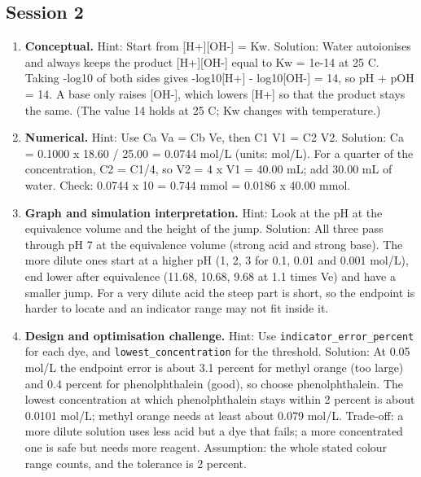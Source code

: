 \documentclass[11pt,a4paper]{article}
\begin{document}
\subsection*{Session 2}
\begin{enumerate}[nosep]
\item \textbf{Conceptual.} Hint: Start from [H+][OH-] = Kw. Solution: Water autoionises and always keeps the product [H+][OH-] equal to Kw = 1e-14 at 25 C. Taking -log10 of both sides gives -log10[H+] - log10[OH-] = 14, so pH + pOH = 14. A base only raises [OH-], which lowers [H+] so that the product stays the same. (The value 14 holds at 25 C; Kw changes with temperature.)
\item \textbf{Numerical.} Hint: Use Ca Va = Cb Ve, then C1 V1 = C2 V2. Solution: Ca = 0.1000 x 18.60 / 25.00 = 0.0744 mol/L (units: mol/L). For a quarter of the concentration, C2 = C1/4, so V2 = 4 x V1 = 40.00 mL; add 30.00 mL of water. Check: 0.0744 x 10 = 0.744 mmol = 0.0186 x 40.00 mmol.
\item \textbf{Graph and simulation interpretation.} Hint: Look at the pH at the equivalence volume and the height of the jump. Solution: All three pass through pH 7 at the equivalence volume (strong acid and strong base). The more dilute ones start at a higher pH (1, 2, 3 for 0.1, 0.01 and 0.001 mol/L), end lower after equivalence (11.68, 10.68, 9.68 at 1.1 times Ve) and have a smaller jump. For a very dilute acid the steep part is short, so the endpoint is harder to locate and an indicator range may not fit inside it.
\item \textbf{Design and optimisation challenge.} Hint: Use \texttt{indicator\_error\_percent} for each dye, and \texttt{lowest\_concentration} for the threshold. Solution: At 0.05 mol/L the endpoint error is about 3.1 percent for methyl orange (too large) and 0.4 percent for phenolphthalein (good), so choose phenolphthalein. The lowest concentration at which phenolphthalein stays within 2 percent is about 0.0101 mol/L; methyl orange needs at least about 0.079 mol/L. Trade-off: a more dilute solution uses less acid but a dye that fails; a more concentrated one is safe but needs more reagent. Assumption: the whole stated colour range counts, and the tolerance is 2 percent.
\end{enumerate}
\end{document}
